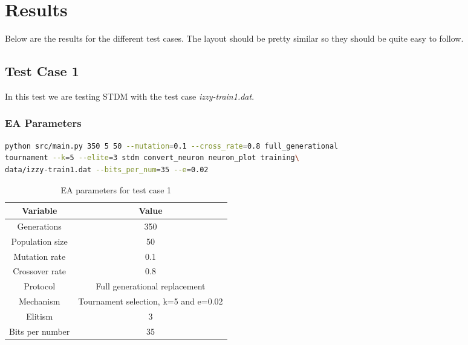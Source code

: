 \section{Results}\label{sec:results}
Below are the results for the different test cases. The layout should be pretty
similar so they should be quite easy to follow.

\subsection{Test Case 1}\label{sec:test-case-1}
In this test we are testing STDM with the test case
\textit{izzy-train1.dat}.
\subsubsection{EA Parameters}\label{sec:test-case-1-parameters}
\begin{lstlisting}[frame=single, language=bash, caption=Command-line to
replicate the results]
python src/main.py 350 5 50 --mutation=0.1 --cross_rate=0.8 full_generational
tournament --k=5 --elite=3 stdm convert_neuron neuron_plot training\
data/izzy-train1.dat --bits_per_num=35 --e=0.02
\end{lstlisting}
\begin{table}[h]
	\begin{tabular}{c c}
		Variable & Value \\
		\hline
		Generations & 350 \\
		\hline
		Population size & 50 \\
		\hline
		Mutation rate & 0.1 \\
		\hline
		Crossover rate & 0.8 \\
		\hline
		Protocol & Full generational replacement \\
		\hline
		Mechanism & Tournament selection, k=5 and e=0.02 \\
		\hline
		Elitism & 3 \\
		\hline
		Bits per number & 35 \\
	\end{tabular}
	\caption{EA parameters for test case 1}
\end{table}
